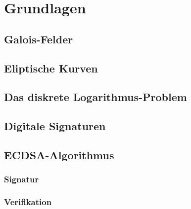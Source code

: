 
\chapter{Grundlagen}


\section{Galois-Felder}


\section{Eliptische Kurven}


\section{Das diskrete Logarithmus-Problem}


\section{Digitale Signaturen}


\section{ECDSA-Algorithmus}

\subsection{Signatur}

\subsection{Verifikation}

